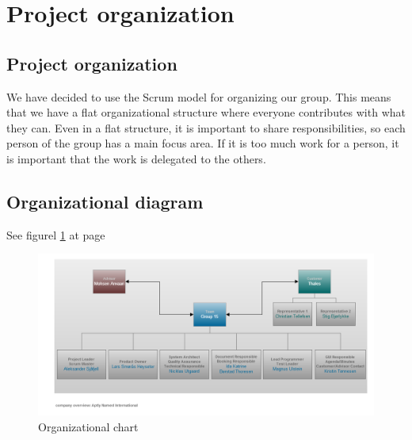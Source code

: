 

\section{Project organization}

\subsection{Project organization}
We have decided to use the Scrum model for organizing our group. This means that we have a flat organizational structure where everyone contributes with what they can. Even in a flat structure, it is important to share responsibilities, so each person of the group has a main focus area. If it is too much work for a person, it is important that the work is delegated to the others.

\subsection{Organizational diagram}
See figurel \ref{fig:organizationalchart} at page \pageref{fig:organizationalchart}
\begin{figure}
\begin{center}
\includegraphics[width=\textwidth]{Organizational_Chart_v2}
\caption{Organizational chart} \label{fig:organizationalchart}
\end{center}
\end{figure}

